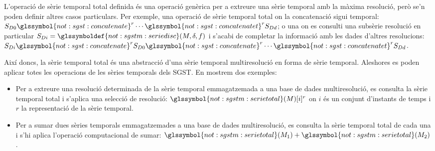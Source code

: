 L'operació de sèrie temporal total definida és una operació genèrica
per a extreure una sèrie temporal amb la màxima resolució, però se'n
poden definir altres casos particulars. Per exemple, una operació de
sèrie temporal total on la concatenació sigui temporal: $S_{D0}
\glssymbol{not:sgst:concatenate}^r \dotsb
\glssymbol{not:sgst:concatenatet}^r S_{Dd}$; o una on es consulti una
subsèrie resolució en particular
$S_{Di}=\glssymboldef{not:sgstm:seriedisc}(M,\delta,f)$ i s'acabi de
completar la informació amb les dades d'altres resolucions: $S_{Di}
\glssymbol{not:sgst:concatenate}^r S_{D0}
\glssymbol{not:sgst:concatenate}^r \dotsb
\glssymbol{not:sgst:concatenatet}^r S_{Dd}$.


Així doncs, la sèrie temporal total és una abstracció d'una sèrie
temporal multiresolució en forma de sèrie temporal. Aleshores es poden
aplicar totes les operacions de les sèries temporals dels
\gls{SGST}. En mostrem dos exemples:
\begin{itemize}
\item Per a extreure una resolució determinada de la sèrie temporal
  emmagatzemada a una base de dades multiresolució, es consulta la
  sèrie temporal total i s'aplica una selecció de resolució:
  $\glssymbol{not:sgstm:serietotal}(M)[i]^r$ on $i$ és un conjunt
  d'instants de temps i $r$ la representació de la sèrie temporal.

\item Per a sumar dues sèries temporals emmagatzemades a una base de
  dades multiresolució, es consulta la sèrie temporal total de cada
  una i s'hi aplica l'operació computacional de sumar:
  $\glssymbol{not:sgstm:serietotal}(M_1)+\glssymbol{not:sgstm:serietotal}(M_2)$.

\end{itemize}






